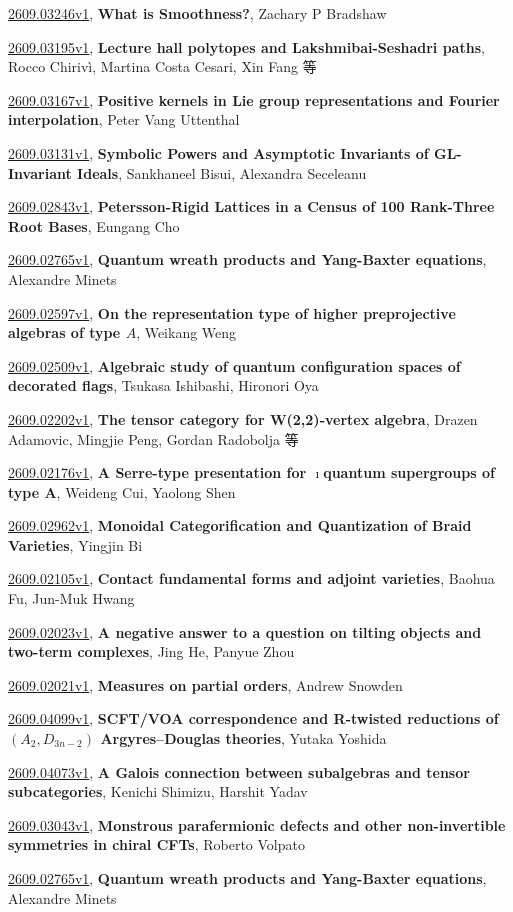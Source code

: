 \documentclass[9pt, a4paper]{article}
\theoremstyle{plain}
\theoremstyle{definition}
\theoremstyle{remark}
\newcommand{\arxiv}[3]{\href{https://arxiv.org/abs/#1}{#1}, \textbf{\textcolor{arxivblue}{#2}}, #3}
\begin{document}
\arxiv{2609.03246v1}{What is Smoothness?}{Zachary P Bradshaw}

\arxiv{2609.03195v1}{Lecture hall polytopes and Lakshmibai-Seshadri paths}{Rocco Chirivì, Martina Costa Cesari, Xin Fang 等}

\arxiv{2609.03167v1}{Positive kernels in Lie group representations and Fourier interpolation}{Peter Vang Uttenthal}

\arxiv{2609.03131v1}{Symbolic Powers and Asymptotic Invariants of GL-Invariant Ideals}{Sankhaneel Bisui, Alexandra Seceleanu}

\arxiv{2609.02843v1}{Petersson-Rigid Lattices in a Census of 100 Rank-Three Root Bases}{Eungang Cho}

\arxiv{2609.02765v1}{Quantum wreath products and Yang-Baxter equations}{Alexandre Minets}

\arxiv{2609.02597v1}{On the representation type of higher preprojective algebras of type $A$}{Weikang Weng}

\arxiv{2609.02509v1}{Algebraic study of quantum configuration spaces of decorated flags}{Tsukasa Ishibashi, Hironori Oya}

\arxiv{2609.02202v1}{The tensor category for W(2,2)-vertex algebra}{Drazen Adamovic, Mingjie Peng, Gordan Radobolja 等}

\arxiv{2609.02176v1}{A Serre-type presentation for $\imath$quantum supergroups of type A}{Weideng Cui, Yaolong Shen}

\arxiv{2609.02962v1}{Monoidal Categorification and Quantization of Braid Varieties}{Yingjin Bi}

\arxiv{2609.02105v1}{Contact fundamental forms and adjoint varieties}{Baohua Fu, Jun-Muk Hwang}

\arxiv{2609.02023v1}{A negative answer to a question on tilting objects and two-term complexes}{Jing He, Panyue Zhou}

\arxiv{2609.02021v1}{Measures on partial orders}{Andrew Snowden}

\arxiv{2609.04099v1}{SCFT/VOA correspondence and R-twisted reductions of $(A_2,D_{3n-2})$ Argyres--Douglas theories}{Yutaka Yoshida}

\arxiv{2609.04073v1}{A Galois connection between subalgebras and tensor subcategories}{Kenichi Shimizu, Harshit Yadav}

\arxiv{2609.03043v1}{Monstrous parafermionic defects and other non-invertible symmetries in chiral CFTs}{Roberto Volpato}

\arxiv{2609.02765v1}{Quantum wreath products and Yang-Baxter equations}{Alexandre Minets}
\end{document}
